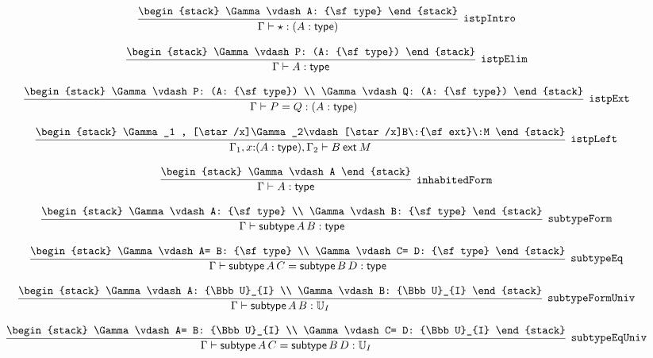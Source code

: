 \[
\infer[{\tt istpIntro}]{\Gamma \vdash \star : (A: {\sf type})}{
\begin{stack}
\Gamma \vdash A: {\sf type}
\end{stack}}
\]

\[
\infer[{\tt istpElim}]{\Gamma \vdash A: {\sf type}}{
\begin{stack}
\Gamma \vdash P: (A: {\sf type})
\end{stack}}
\]

\[
\infer[{\tt istpExt}]{\Gamma \vdash P= Q: (A: {\sf type})}{
\begin{stack}
\Gamma \vdash P: (A: {\sf type})
\\
\Gamma \vdash Q: (A: {\sf type})
\end{stack}}
\]

\[
\infer[{\tt istpLeft}]{\Gamma_1 ,x\mathord{:}(A: {\sf type}), \Gamma_2 \vdash B\:{\sf ext}\:M}{
\begin{stack}
\Gamma_1 , [\star /x]\Gamma_2\vdash [\star /x]B\:{\sf ext}\:M
\end{stack}}
\]

\[
\infer[{\tt inhabitedForm}]{\Gamma \vdash A: {\sf type}}{
\begin{stack}
\Gamma \vdash A
\end{stack}}
\]

\[
\infer[{\tt subtypeForm}]{\Gamma \vdash {\sf subtype}\,A\,B: {\sf type}}{
\begin{stack}
\Gamma \vdash A: {\sf type}
\\
\Gamma \vdash B: {\sf type}
\end{stack}}
\]

\[
\infer[{\tt subtypeEq}]{\Gamma \vdash {\sf subtype}\,A\,C= {\sf subtype}\,B\,D: {\sf type}}{
\begin{stack}
\Gamma \vdash A= B: {\sf type}
\\
\Gamma \vdash C= D: {\sf type}
\end{stack}}
\]

\[
\infer[{\tt subtypeFormUniv}]{\Gamma \vdash {\sf subtype}\,A\,B: {\Bbb U}_{I}}{
\begin{stack}
\Gamma \vdash A: {\Bbb U}_{I}
\\
\Gamma \vdash B: {\Bbb U}_{I}
\end{stack}}
\]

\[
\infer[{\tt subtypeEqUniv}]{\Gamma \vdash {\sf subtype}\,A\,C= {\sf subtype}\,B\,D: {\Bbb U}_{I}}{
\begin{stack}
\Gamma \vdash A= B: {\Bbb U}_{I}
\\
\Gamma \vdash C= D: {\Bbb U}_{I}
\end{stack}}
\]

